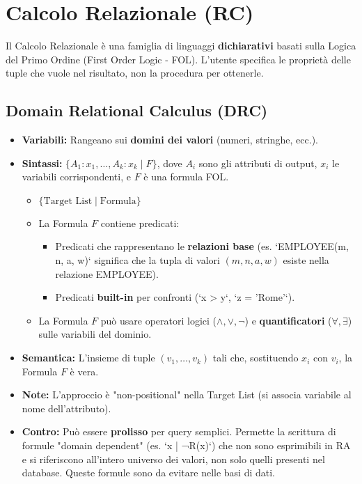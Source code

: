 \documentclass{article}
\newcommand{\landop}{\wedge}
\newcommand{\vel}{\vee}
\newcommand{\negop}{\neg}
\newcommand{\forallop}{\forall}
\newcommand{\existsop}{\exists}
\begin{document}
	\section{Calcolo Relazionale (RC)}
	
	Il Calcolo Relazionale è una famiglia di linguaggi \textbf{dichiarativi} basati sulla Logica del Primo Ordine (First Order Logic - FOL). L'utente specifica le proprietà delle tuple che vuole nel risultato, non la procedura per ottenerle.
	
	\subsection{Domain Relational Calculus (DRC)}
	\begin{itemize}
		\item \textbf{Variabili:} Rangeano sui \textbf{domini dei valori} (numeri, stringhe, ecc.).
		\item \textbf{Sintassi:} $\{ A_1: x_1, \dots, A_k: x_k \mid F \}$, dove $A_i$ sono gli attributi di output, $x_i$ le variabili corrispondenti, e $F$ è una formula FOL.
		\begin{itemize}
			\item $\{ \text{Target List} \mid \text{Formula} \}$
			\item La Formula $F$ contiene predicati:
			\begin{itemize}
				\item Predicati che rappresentano le \textbf{relazioni base} (es. `EMPLOYEE(m, n, a, w)` significa che la tupla di valori $(m, n, a, w)$ esiste nella relazione EMPLOYEE).
				\item Predicati \textbf{built-in} per confronti (`x > y`, `z = 'Rome'`).
			\end{itemize}
			\item La Formula $F$ può usare operatori logici ($\landop, \vel, \negop$) e \textbf{quantificatori} ($\forallop, \existsop$) sulle variabili del dominio.
		\end{itemize}
		\item \textbf{Semantica:} L'insieme di tuple $(v_1, \dots, v_k)$ tali che, sostituendo $x_i$ con $v_i$, la Formula $F$ è vera.
		\item \textbf{Note:} L'approccio è "non-positional" nella Target List (si associa variabile al nome dell'attributo).
		\item \textbf{Contro:} Può essere \textbf{prolisso} per query semplici. Permette la scrittura di formule "domain dependent" (es. `{x | ¬R(x)}`) che non sono esprimibili in RA e si riferiscono all'intero universo dei valori, non solo quelli presenti nel database. Queste formule sono da evitare nelle basi di dati.
	\end{itemize}
	
\end{document}
